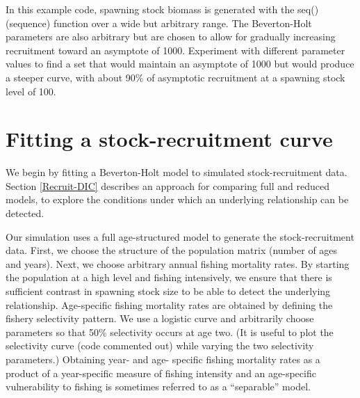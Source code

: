 \documentclass[
]{krantz}
\begin{document}
In this example code, spawning stock biomass is generated with the seq() (sequence) function over a wide but arbitrary range. The Beverton-Holt parameters are also arbitrary but are chosen to allow for gradually increasing recruitment toward an asymptote of 1000. Experiment with different parameter values to find a set that would maintain an asymptote of 1000 but would produce a steeper curve, with about 90\% of asymptotic recruitment at a spawning stock level of 100.

\hypertarget{Recruit-Fit}{%
\section{Fitting a stock-recruitment curve}\label{Recruit-Fit}}

We begin by fitting a Beverton-Holt model to simulated stock-recruitment data. Section \ref{Recruit-DIC} describes an approach for comparing full and reduced models, to explore the conditions under which an underlying relationship can be detected.

Our simulation uses a full age-structured model to generate the stock-recruitment data. First, we choose the structure of the population matrix (number of ages and years). Next, we choose arbitrary annual fishing mortality rates. By starting the population at a high level and fishing intensively, we ensure that there is sufficient contrast \citep{hilborn.walters_1992} in spawning stock size to be able to detect the underlying relationship. Age-specific fishing mortality rates are obtained by defining the fishery selectivity pattern. We use a logistic curve and arbitrarily choose parameters so that 50\% selectivity occurs at age two. (It is useful to plot the selectivity curve (code commented out) while varying the two selectivity parameters.) Obtaining year- and age- specific fishing mortality rates as a product of a year-specific measure of fishing intensity and an age-specific vulnerability to fishing is sometimes referred to as a ``separable'' model.
\end{document}
